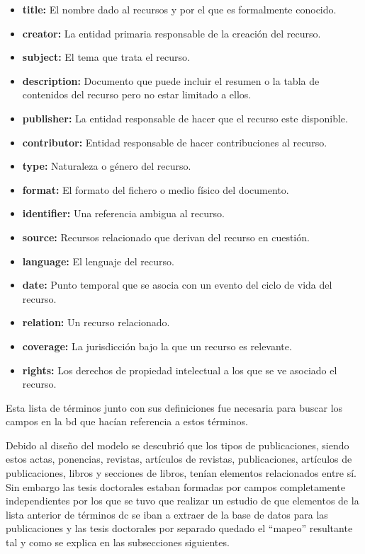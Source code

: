 \begin{itemize}
	\item \textbf{title:} El nombre dado al recursos y por el que es formalmente conocido.
	\item \textbf{creator:} La entidad primaria responsable de la creación del recurso.
	\item \textbf{subject:} El tema que trata el recurso.
	\item \textbf{description:} Documento que puede incluir el resumen o la tabla de contenidos del recurso pero no estar limitado a ellos.
	\item \textbf{publisher:} La entidad responsable de hacer que el recurso este disponible.
	\item \textbf{contributor:} Entidad responsable de hacer contribuciones al recurso.
	\item \textbf{type:} Naturaleza o género del recurso.
	\item \textbf{format:} El formato del fichero o medio físico del documento.
	\item \textbf{identifier:} Una referencia ambigua al recurso.
	\item \textbf{source:} Recursos relacionado que derivan del recurso en cuestión.
	\item \textbf{language:} El lenguaje del recurso.
	\item \textbf{date:} Punto temporal que se asocia con un evento del ciclo de vida del recurso.
	\item \textbf{relation:} Un recurso relacionado.
	\item \textbf{coverage:} La jurisdicción bajo la que un recurso es relevante.
	\item \textbf{rights:} Los derechos de propiedad intelectual a los que se ve asociado el recurso.
\end{itemize}

Esta lista de términos junto con sus definiciones fue necesaria para buscar los campos en la \acrshort{bd} que hacían referencia a estos términos.

Debido al diseño del modelo se descubrió que los tipos de publicaciones, siendo estos actas, ponencias, revistas, artículos de revistas, publicaciones, artículos de publicaciones, libros y secciones de libros, tenían elementos relacionados entre sí. Sin embargo las tesis doctorales estaban formadas por campos completamente independientes por los que se tuvo que realizar un estudio de que elementos de la lista anterior de términos \acrshort{dc} se iban a extraer de la base de datos para las publicaciones y las tesis doctorales por separado quedado el ``mapeo'' resultante tal y como se explica en las subsecciones siguientes.

